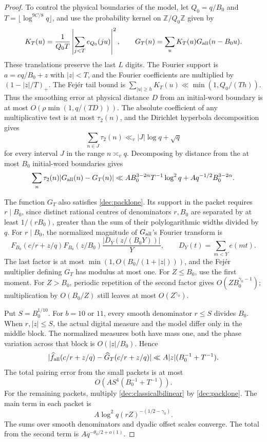 \documentclass[11pt,a4paper]{article}
\theoremstyle{paperplain}
\numberwithin{equation}{section}
\begin{document}
\begin{proof}
To control the physical boundaries of the model, let $Q_0=q/B_0$
and $T=\lfloor\log^{9C/8}q\rfloor$, and use the probability kernel
on $\mathbb Z/Q_0\mathbb Z$ given by
\[
 K_T(u)=\frac1{Q_0T}\left|\sum_{j<T}e_{Q_0}(ju)\right|^2,\qquad
 G_T(n)=\sum_uK_T(u)G_{\rm all}(n-B_0u).
\]
These translations preserve the last $L$ digits.
The Fourier support is $a=cq/B_0+z$ with $|z|<T$, and the
Fourier coefficients are multiplied by $(1-|z|/T)_+$.
The Fej\'er tail bound is
$\sum_{|u|\ge h}K_T(u)\ll\min(1,Q_0/(Th))$.
Thus the smoothing error at physical distance $D$ from an initial-word
boundary is at most $O(\rho\min(1,q/(TD)))$.
The absolute coefficient of any multiplicative test is at most
$\tau_2(n)$, and the Dirichlet hyperbola decomposition gives
\[
 \sum_{n\in J}\tau_2(n)\ll_v |J|\log q+\sqrt q
\]
for every interval $J$ in the range $n\asymp_vq$.
Decomposing by distance from the at most $B_0$ initial-word boundaries
gives
\begin{equation}\label{dec:smoothing}
 \sum_n\tau_2(n)|G_{\rm all}(n)-G_T(n)|
 \ll A B_0^{3-2\alpha}T^{-1}\log^2q
      +Aq^{-1/2}B_0^{3-2\alpha}.
\end{equation}

The function $G_T$ also satisfies \eqref{dec:packlone}. Its support
in the packet requires $r\mid B_0$, since distinct rational centres
of denominators $r,B_0$ are separated by at least $1/(rB_0)$, greater
than the sum of their polylogarithmic widths divided by $q$. For
$r\mid B_0$, the normalized magnitude of $G_{\rm all}$'s
Fourier transform is
\[
 F_{B_0}(c/r+z/q)F_{B_0}(z/B_0)
       \frac{|D_Y(z/(B_0Y))|}{Y},\qquad
 D_Y(t)=\sum_{m<Y}e(mt).
\]
The last factor is at most $\min(1,O(B_0/(1+|z|)))$, and the Fej\'er multiplier defining $G_T$ has modulus at most one.
For $Z\le B_0$, use the first moment.
For $Z>B_0$, periodic repetition of the second factor gives
$O(ZB_0^{\gamma_0-1})$; multiplication by $O(B_0/Z)$ still
leaves at most $O(Z^{\gamma_0})$.

Put $S=B_0^{1/10}$.
For $b=10$ or $11$, every smooth denominator $r\le S$ divides $B_0$.
When $r,|z|\le S$, the actual digital measure and the model differ only
in the middle block. The normalized measures both have mass one, and the phase
variation across that block is $O(|z|/B_0)$. Hence
\[
 |\widehat f_{\rm all}(c/r+z/q)-\widehat G_T(c/r+z/q)|
 \ll A|z|(B_0^{-1}+T^{-1}).
\]
The total pairing error from the small packets is at most
\[
 O(AS^4(B_0^{-1}+T^{-1})).
\]
For the remaining packets, multiply \eqref{dec:classicalbilinear}
by \eqref{dec:packlone}. The main term in each packet is
\[
 A\log^2q(rZ)^{-(1/2-\gamma_0)}.
\]
The sums over smooth denominators and dyadic offset scales converge.
The total from the second term is $Aq^{-\theta_0/2+o(1)}$.


\end{proof}
\end{document}
